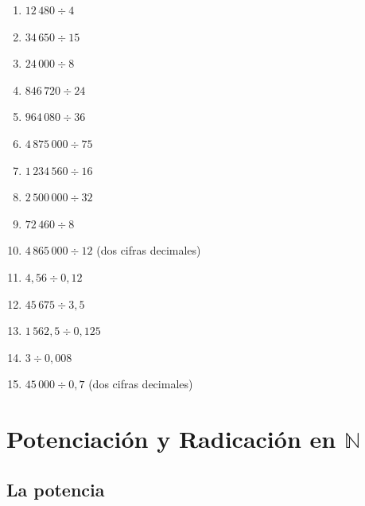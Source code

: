 \documentclass[12pt, letterpaper]{article}
\newcommand{\N}{\mathbb{N}}
\begin{document}
\begin{enumerate}[leftmargin=*]
  \item \facil{} $12\,480 \div 4$

  \item \facil{} $34\,650 \div 15$

  \item \facil{} $24\,000 \div 8$

  \item \medio{} $846\,720 \div 24$

  \item \medio{} $964\,080 \div 36$

  \item \medio{} $4\,875\,000 \div 75$

  \item \medio{} $1\,234\,560 \div 16$

  \item \medio{} $2\,500\,000 \div 32$

  \item \medio{} $72\,460 \div 8$

  \item \medio{} $4\,865\,000 \div 12$ (dos cifras decimales)

  \item \dificil{} $4{,}56 \div 0{,}12$

  \item \dificil{} $45\,675 \div 3{,}5$

  \item \dificil{} $1\,562{,}5 \div 0{,}125$

  \item \dificil{} $3 \div 0{,}008$

  \item \dificil{} $45\,000 \div 0{,}7$ (dos cifras decimales)
\end{enumerate}

\newpage

\section{Potenciación y Radicación en $\N$}

\subsection{La potencia}
\end{document}
